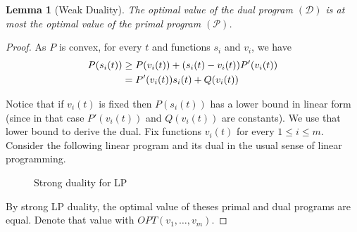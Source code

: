\documentclass[11pt,a4paper]{article}
\newtheorem{lemma}{Lemma}
\begin{document}
\begin{lemma}[Weak Duality] 	\label{lem:formulation-PD}
The optimal value of the dual program $(\mathcal{D})$ is at most the optimal value of the primal program
$(\mathcal{P})$.
\end{lemma}
\begin{proof}
As $P$ is convex, for every $t$ and functions $s_{i}$ and $v_{i}$, we have
\begin{align}	\label{ineq:convex-energy+values}
P(s_{i}(t)) &\geq P(v_{i}(t)) + (s_{i}(t) - v_{i}(t)) P'(v_{i}(t)) \notag \\
	&= P'(v_{i}(t)) s_{i}(t) + Q(v_{i}(t))
\end{align}

Notice that if $v_{i}(t)$ is fixed then $P(s_{i}(t))$ has a lower bound in linear form
(since in that case  $P'(v_{i}(t))$ and $Q(v_{i}(t))$ are constants).
We use that lower bound to derive the dual.  
Fix functions $v_{i}(t)$ for every $1 \leq i \leq m$. 
Consider the following linear program and its dual
in the usual sense of linear programming.


\begin{figure}[ht]	
\caption{Strong duality for LP}
\label{fig:weak-duality}
\end{figure}
By strong LP duality, the optimal value of theses primal and dual programs are equal. Denote that value with $OPT(v_{1}, \ldots, v_{m})$.  


\end{proof}
\end{document}
